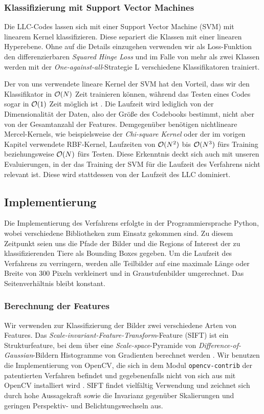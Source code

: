\subsubsection{Klassifizierung mit Support Vector Machines}

Die LLC-Codes lassen sich mit einer Support Vector Machine (SVM) mit linearem Kernel klassifizieren. Diese separiert die Klassen mit einer linearen Hyperebene. Ohne auf die Details einzugehen verwenden wir als Loss-Funktion den differenzierbaren \emph{Squared Hinge Loss} und im Falle von mehr als zwei Klassen werden mit der \emph{One-against-all}-Strategie L verschiedene Klassifikatoren trainiert.

Der von uns verwendete lineare Kernel der SVM hat den Vorteil, dass wir den Klassifikator in $\mathcal{O}(N)$ Zeit trainieren können, während das Testen eines Codes sogar in $\mathcal{O}(1)$ Zeit möglich ist \cite{yygh09}. Die Laufzeit wird lediglich von der Dimensionalität der Daten, also der Größe des Codebooks bestimmt, nicht aber von der Gesamtanzahl der Features. Demgegenüber benötigen nichtlineare Mercel-Kernels, wie beispielsweise der \emph{Chi-square Kernel} oder der im vorigen Kapitel verwendete RBF-Kernel, Laufzeiten von $\mathcal{O}(N^2)$ bis $\mathcal{O}(N^3)$ fürs Training beziehungsweise $\mathcal{O}(N)$ fürs Testen. Diese Erkenntnis deckt sich auch mit unseren Evaluierungen, in der das Training der SVM für die Laufzeit des Verfahrens nicht relevant ist. Diese wird stattdessen von der Laufzeit des LLC dominiert.

\subsection{Implementierung}

Die Implementierung des Verfahrens erfolgte in der Programmiersprache Python, wobei verschiedene Bibliotheken zum Einsatz gekommen sind. Zu diesem Zeitpunkt seien uns die Pfade der Bilder und die Regions of Interest der zu klassifizierenden Tiere als Bounding Boxes gegeben. Um die Laufzeit des Verfahrens zu verringern, werden alle Teilbilder auf eine maximale Länge oder Breite von 300 Pixeln verkleinert und in Graustufenbilder umgerechnet. Das Seitenverhältnis bleibt konstant.

\subsubsection{Berechnung der Features}

Wir verwenden zur Klassifizierung der Bilder zwei verschiedene Arten von Features. Das \emph{Scale-invariant-Feature-Transform}-Feature (SIFT) ist ein Strukturfeature, bei dem über eine \emph{Scale-space}-Pyramide von \emph{Difference-of-Gaussian}-Bildern Histogramme von Gradienten berechnet werden \cite{lowe99}. Wir benutzen die Implementierung von OpenCV, die sich in dem Modul \texttt{opencv-contrib} der patentierten Verfahren befindet und gegebenenfalls nicht von sich aus mit OpenCV installiert wird \cite{ocv}. SIFT findet vielfältig Verwendung und zeichnet sich durch hohe Aussagekraft sowie die Invarianz gegenüber Skalierungen und geringen Perspektiv- und Belichtungswechseln aus.

